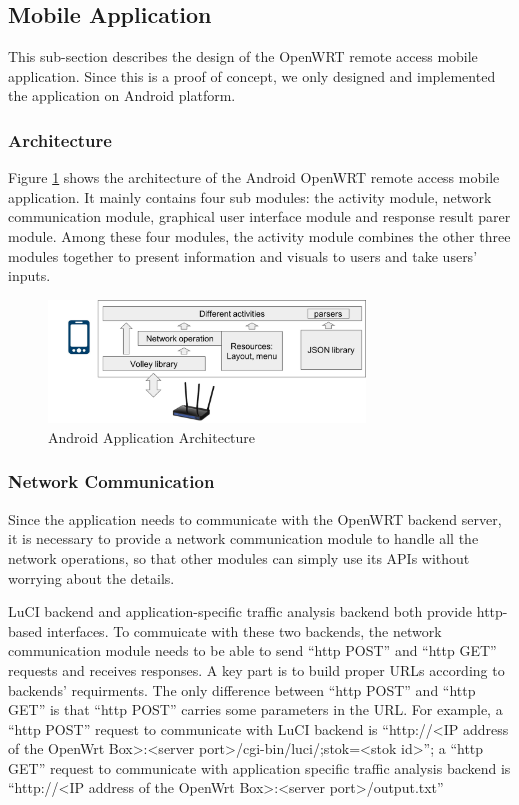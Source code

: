 \subsection{Mobile Application}
This sub-section describes the design of the OpenWRT remote access mobile application. Since this is a proof of concept, we only designed and implemented the application on Android platform.

\subsubsection{Architecture}
Figure \ref{android-architecture} shows the architecture of the Android OpenWRT remote access mobile application. It mainly contains four sub modules: the activity module, network communication module, graphical user interface module and response result parer module. Among these four modules, the activity module combines the other three modules together to present information and visuals to users and take users' inputs.
	\begin{figure}
		\centering
		\includegraphics[width=0.75\textwidth]{android-architecture.png}
		\caption{Android Application Architecture}
		\label{android-architecture}
	\end{figure}

\subsubsection{Network Communication}
Since the application needs to communicate with the OpenWRT backend server, it is necessary to provide a network communication module to handle all the network operations, so that other modules can simply use its APIs without worrying about the details.

LuCI backend and application-specific traffic analysis backend both provide http-based interfaces. To commuicate with these two backends, the network communication module needs to be able to send ``http POST'' and ``http GET'' requests and receives responses. A key part is to build proper URLs according to backends' requirments. The only difference between ``http POST'' and ``http GET'' is that ``http POST'' carries some parameters in the URL. For example, a ``http POST'' request to communicate with LuCI backend is ``http://<IP address of the OpenWrt Box>:<server port>/cgi-bin/luci/;stok=<stok id>''; a ``http GET'' request to communicate with application specific traffic analysis backend is ``http://<IP address of the OpenWrt Box>:<server port>/output.txt''

